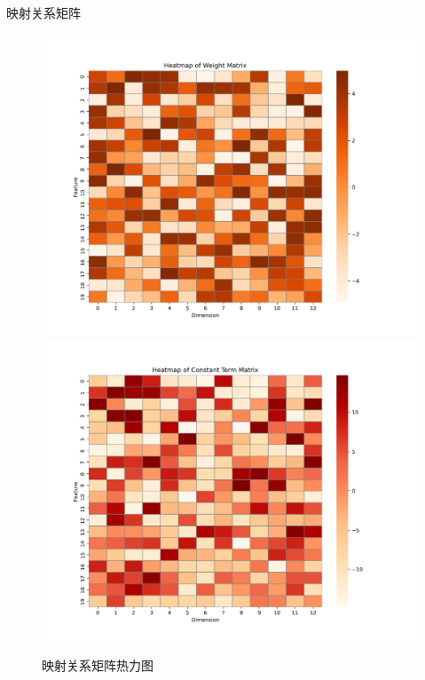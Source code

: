 \documentclass[10pt]{beamer}
\begin{document}
\begin{frame}{映射关系矩阵}
    \begin{figure}[h]
        \caption{\label{fig:heatmap}映射关系矩阵热力图}
        \centering
        \includegraphics[scale=0.22]{Weight_Matrix_Heatmap.png}
        \hfill
        \includegraphics[scale=0.22]{Error_Matrix_Heatmap.png}
    \end{figure}
\end{frame}
\end{document}
